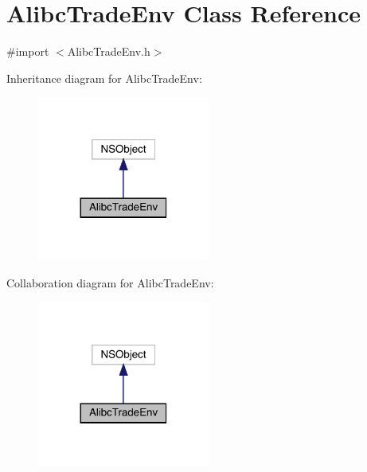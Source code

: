 \hypertarget{interface_alibc_trade_env}{}\section{Alibc\+Trade\+Env Class Reference}
\label{interface_alibc_trade_env}


{\ttfamily \#import $<$Alibc\+Trade\+Env.\+h$>$}



Inheritance diagram for Alibc\+Trade\+Env\+:\nopagebreak
\begin{figure}[H]
\begin{center}
\leavevmode
\includegraphics[width=161pt]{interface_alibc_trade_env__inherit__graph}
\end{center}
\end{figure}


Collaboration diagram for Alibc\+Trade\+Env\+:\nopagebreak
\begin{figure}[H]
\begin{center}
\leavevmode
\includegraphics[width=161pt]{interface_alibc_trade_env__coll__graph}
\end{center}
\end{figure}
